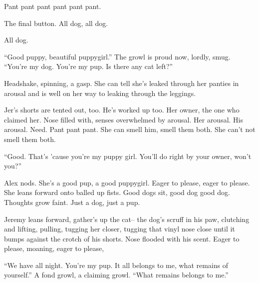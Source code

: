 Pant pant pant pant pant pant.

The final button. All dog, all dog.

All dog.

``Good puppy, beautiful puppygirl.'' The growl is proud now, lordly, smug. ``You're my dog. You're my pup. Is there any cat left?''

Headshake, spinning, a gasp. She can tell she's leaked through her panties in arousal and is well on her way to leaking through the leggings.

Jer's shorts are tented out, too. He's worked up too. Her owner, the one who claimed her. Nose filled with, senses overwhelmed by arousal. Her arousal. His arousal. Need. Pant pant pant. She can smell him, smell them both. She can't not smell them both.

``Good. That's 'cause you're my puppy girl. You'll do right by your owner, won't you?''

Alex nods. She's a good pup, a good puppygirl. Eager to please, eager to please. She leans forward onto balled up fists. Good dogs sit, good dog good dog. Thoughts grow faint. Just a dog, just a pup.

Jeremy leans forward, gather's up the cat-- the dog's scruff in his paw, clutching and lifting, pulling, tugging her closer, tugging that vinyl nose close until it bumps against the crotch of his shorts. Nose flooded with his scent. Eager to please, moaning, eager to please,

``We have all night. You're my pup. It all belongs to me, what remains of yourself.'' A fond growl, a claiming growl. ``What remains belongs to me.''
